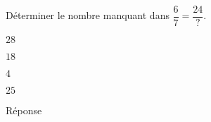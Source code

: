 \begin{exercice}
    Déterminer le nombre manquant dans $\dfrac{6}{7}=\dfrac{24}{\text{?}}$.
    \begin{ChoixQCM}{4}
        \item $28$
        \item $18$
        \item $4$
        \item $25$
    \end{ChoixQCM}
\end{exercice}
\begin{corrige}
    Réponse 
\end{corrige}